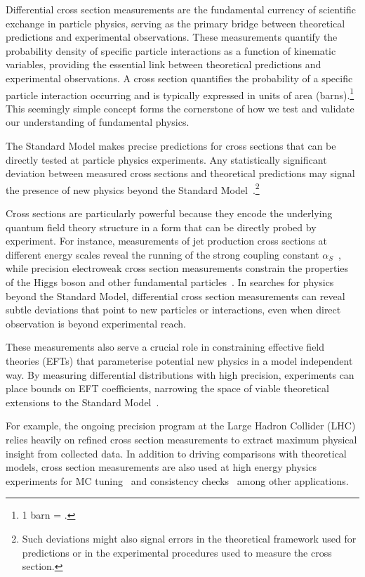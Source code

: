 \begin{definition}
Differential cross section measurements are the fundamental currency of scientific exchange in particle physics, serving as the primary bridge between theoretical predictions and experimental observations.
%
These measurements quantify the probability density of specific particle interactions as a function of kinematic variables, providing the essential link between theoretical predictions and experimental observations.
%
 A cross section quantifies the probability of a specific particle interaction occurring and is typically expressed in units of area (barns).\footnote{1 barn = .} This seemingly simple concept forms the cornerstone of how we test and validate our understanding of fundamental physics.
 
The Standard Model makes precise predictions for cross sections that can be directly tested at particle physics experiments.
%
Any statistically significant deviation between measured cross sections and theoretical predictions may signal the presence of new physics beyond the Standard Model~\cite{particle_data_group_review_2022}.\footnote{Such deviations might also signal errors in the theoretical framework used for predictions or in the experimental procedures used to measure the cross section.
} 

Cross sections are particularly powerful because they encode the underlying quantum field theory structure in a form that can be directly probed by experiment.
%
For instance, measurements of jet production cross sections at different energy scales reveal the running of the strong coupling constant \(\alpha_S\)~\cite{chiefa_parton_2025}, while precision electroweak cross section measurements constrain the properties of the Higgs boson and other fundamental particles~\cite{noauthor_precision_2006}.
%
In searches for physics beyond the Standard Model, differential cross section measurements can reveal subtle deviations that point to new particles or interactions, even when direct observation is beyond experimental reach.

These measurements also serve a crucial role in constraining effective field theories (EFTs) that parameterise potential new physics in a model independent way.
%
By measuring differential distributions with high precision, experiments can place bounds on EFT coefficients, narrowing the space of viable theoretical extensions to the Standard Model~\cite{contino_validity_2016}.

For example, the ongoing precision program at the Large Hadron Collider (LHC) relies heavily on refined cross section measurements to extract maximum physical insight from collected data.
%
In addition to driving comparisons with theoretical models, cross section measurements are also used at high energy physics experiments for MC tuning~\cite{albert_antares_2025} and consistency checks~\cite{buckley_constraints_2025} among other applications.


\end{definition}
